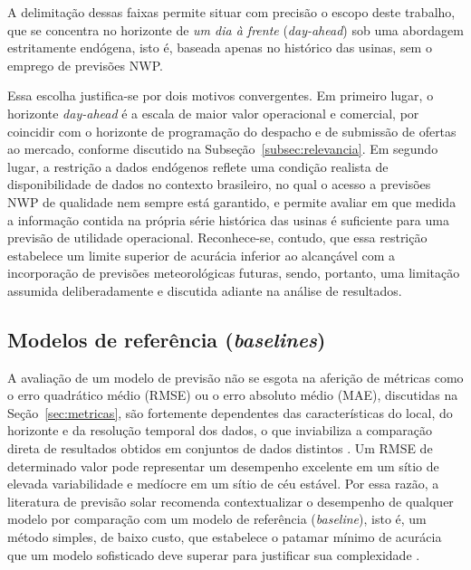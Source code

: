 A delimitação dessas faixas permite situar com precisão o escopo deste trabalho, que se
concentra no horizonte de \emph{um dia à frente} (\emph{day-ahead}) sob uma abordagem
estritamente endógena, isto é, baseada apenas no histórico das usinas, sem o emprego de
previsões NWP.

Essa escolha justifica-se por dois motivos convergentes. Em primeiro lugar, o horizonte
\emph{day-ahead} é a escala de maior valor operacional e comercial, por coincidir com o
horizonte de programação do despacho e de submissão de ofertas ao mercado, conforme
discutido na Subseção~\ref{subsec:relevancia}. Em segundo lugar, a restrição a dados
endógenos reflete uma condição realista de disponibilidade de dados no contexto brasileiro,
no qual o acesso a previsões NWP de qualidade nem sempre está garantido, e permite avaliar
em que medida a informação contida na própria série histórica das usinas é suficiente para
uma previsão de utilidade operacional. Reconhece-se, contudo, que essa restrição estabelece
um limite superior de acurácia inferior ao alcançável com a incorporação de previsões
meteorológicas futuras, sendo, portanto, uma limitação assumida deliberadamente e discutida adiante na análise
de resultados.

\subsection{Modelos de referência (\textit{baselines})}
\label{subsec:modelos_referencia}



A avaliação de um modelo de previsão não se esgota na aferição de métricas como o erro quadrático médio (RMSE) ou o erro absoluto médio (MAE), discutidas na
Seção~\ref{sec:metricas}, são fortemente dependentes das características do local, do
horizonte e da resolução temporal dos dados, o que inviabiliza a comparação direta de
resultados obtidos em conjuntos de dados distintos \cite{Markovics2022}. Um RMSE de
determinado valor pode representar um desempenho excelente em um sítio de elevada
variabilidade e medíocre em um sítio de céu estável. Por essa razão, a literatura de
previsão solar recomenda contextualizar o desempenho de qualquer modelo por comparação com
um modelo de referência (\emph{baseline}), isto é, um método simples, de baixo custo, que
estabelece o patamar mínimo de acurácia que um modelo sofisticado deve superar para
justificar sua complexidade \cite{Sarmas2022}.

